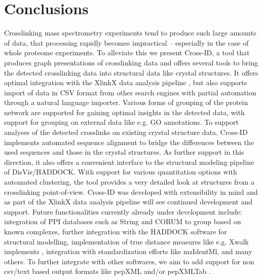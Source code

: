 \section{Conclusions}
Crosslinking mass spectrometry experiments tend to produce such large amounts of data, that processing rapidly becomes impractical – especially in the case of whole proteome experiments. To alleviate this we present Cross-ID, a tool that produces graph presentations of crosslinking data and offers several tools to bring the detected crosslinking data into structural data like crystal structures. It offers optimal integration with the XlinkX data analysis pipeline \cite{liu2017optimized, klykov2018efficient}, but also supports import of data in CSV format from other search engines with partial automation through a natural language importer. Various forms of grouping of the protein network are supported for gaining optimal insights in the detected data, with support for grouping on external data like e.g. GO annotations. To support analyses of the detected crosslinks on existing crystal structure data, Cross-ID implements automated sequence alignment to bridge the differences between the used sequences and those in the crystal structures. As further support in this direction, it also offers a convenient interface to the structural modeling pipeline of DisVis/HADDOCK. With support for various quantitation options with automated clustering, the tool provides a very detailed look at structures from a crosslinking point-of-view. Cross-ID was developed with extensibility in mind and as part of the XlinkX data analysis pipeline will see continued development and support. Future functionalities currently already under development include: integration of PPI databases such as String \cite{szklarczyk2015string} and CORUM \cite{ruepp2008corum:} to group based on known complexes, further integration with the HADDOCK software for structural modelling, implementation of true distance measures like e.g. Xwalk implements \cite{kahraman2011xwalk:}, integration with standardization efforts like mzIdentMl, and many others. To further integrate with other softwares, we aim to add support for non csv/text based output formats like pepXML \cite{hoopmann2016open} and/or pepXMLTab \cite{xiaojingwang2018pepxmltab:}.

